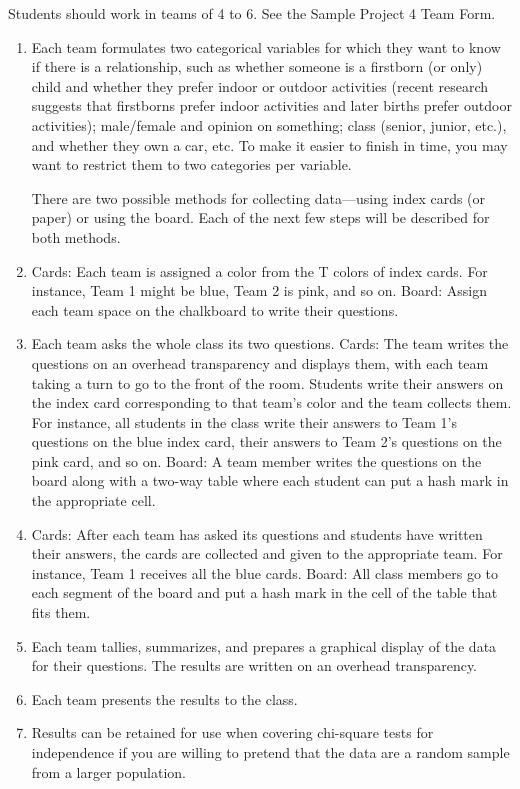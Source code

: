 \documentclass[twoside,openany]{tufte-book}
\begin{document}
Students should work in teams of 4 to 6. See the Sample Project 4 Team Form.

\renewcommand{\labelenumi}{\textbf{Step \arabic{enumi}:}}
\begin{enumerate}[leftmargin=*, itemsep=1em]
\item Each team formulates two categorical variables for which they want to know if there is a relationship, such as whether someone is a firstborn (or only) child and whether they prefer indoor or outdoor activities (recent research suggests that firstborns prefer indoor activities and later births prefer outdoor activities); male/female and opinion on something; class (senior, junior, etc.), and whether they own a car, etc. To make it easier to finish in time, you may want to restrict them to two categories per variable.

There are two possible methods for collecting data---using index cards (or paper) or using the board. Each of the next few steps will be described for both methods.

\item Cards: Each team is assigned a color from the T colors of index cards. For instance, Team 1 might be blue, Team 2 is pink, and so on. Board: Assign each team space on the chalkboard to write their questions.

\item Each team asks the whole class its two questions. Cards: The team writes the questions on an overhead transparency and displays them, with each team taking a turn to go to the front of the room. Students write their answers on the index card corresponding to that team's color and the team collects them. For instance, all students in the class write their answers to Team 1's questions on the blue index card, their answers to Team 2's questions on the pink card, and so on. Board: A team member writes the questions on the board along with a two-way table where each student can put a hash mark in the appropriate cell. 

\item Cards: After each team has asked its questions and students have written their answers, the cards are collected and given to the appropriate team. For instance, Team 1 receives all the blue cards. Board: All class members go to each segment of the board and put a hash mark in the cell of the table that fits them.

\item Each team tallies, summarizes, and prepares a graphical display of the data for their questions. The results are written on an overhead transparency.

\item Each team presents the results to the class.

\item Results can be retained for use when covering chi-square tests for independence if you are willing to pretend that the data are a random sample from a larger population.
\end{enumerate}
\end{document}
